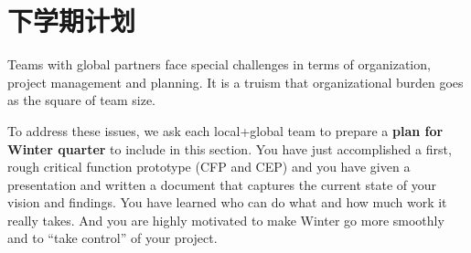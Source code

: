 \chapter{下学期计划}
\label{project-planning}

\begin{remark}\color{blue}
Teams with global partners face special challenges in  terms of organization, project management and planning.
It is a truism that organizational burden goes as the square of team size. 

To address these issues, we ask each local+global team to prepare a \textbf{plan for Winter quarter} to include in this section. You have just accomplished a first, rough critical function prototype (CFP and CEP) and you have given a presentation and written a document that captures the current state of your vision and findings. You have learned who can do what and how much work it really takes. And you are highly motivated to make Winter go more smoothly and to ``take control'' of your project.
\normalcolor
\end{remark}



